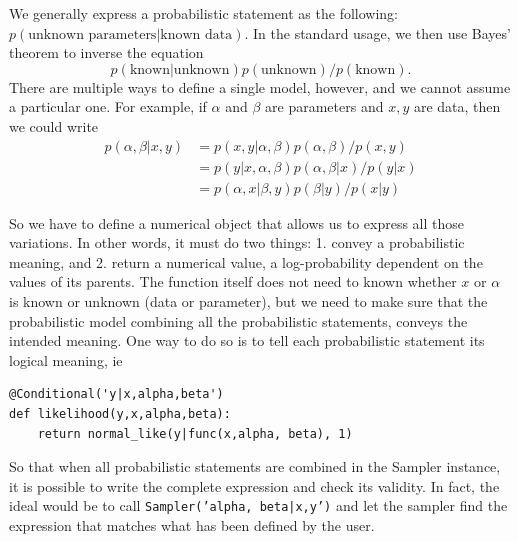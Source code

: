 \documentclass[]{book}
\begin{document}
We generally express a probabilistic statement as the following:
$p(\textrm{unknown parameters}| \textrm{known data})$. In the standard usage, we then use Bayes' theorem to inverse the equation
$$p(\textrm{known}| \textrm{unknown})p(\textrm{unknown} )/p(\textrm{known} ).$$ There are multiple ways to define a single model, however, and we cannot assume  a particular one. For example, if $\alpha$ and $\beta$ are parameters and $x,y $ are data, then we could write
\begin{align}
p(\alpha, \beta|x,y) & = p(x,y|\alpha , \beta)p(\alpha,\beta)/p(x,y)\\
& =p(y|x,\alpha,\beta)p(\alpha,\beta|x)/p(y|x )\\
& = p(\alpha, x|\beta ,y)p(\beta|y)/p(x|y)
\end{align}

So we have to define a numerical object that allows us to express all those variations. In other words, it must do two things: 1. convey a probabilistic meaning, and 2. return a numerical value, a log-probability dependent on the values of its parents. The function itself does not need to known whether $x$ or $\alpha $ is known or unknown (data or parameter), but we need to make sure that the probabilistic model combining all the probabilistic statements, conveys the intended meaning. One way to do so is to tell each probabilistic statement its logical meaning, ie
\begin{verbatim}
@Conditional('y|x,alpha,beta')
def likelihood(y,x,alpha,beta):
    return normal_like(y|func(x,alpha, beta), 1)
\end{verbatim}
So that when all probabilistic statements are combined in the Sampler instance, it is possible to write the complete expression and check its validity. In fact, the ideal would be to call
\texttt{Sampler('alpha, beta|x,y')} and let the sampler find the expression that matches what has been defined by the user.
\end{document}
